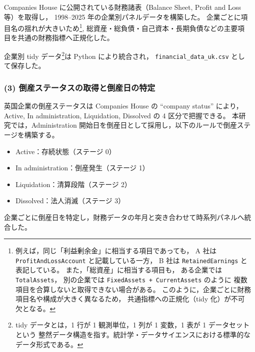 Companies House に公開されている財務諸表（Balance Sheet, Profit and Loss 等）を取得し，
1998--2025 年の企業別パネルデータを構築した。
企業ごとに項目名の揺れが大きいため\footnote{
例えば，同じ「利益剰余金」に相当する項目であっても，
A 社は \texttt{ProfitAndLossAccount} と記載している一方，
B 社は \texttt{RetainedEarnings} と表記している。
また，「総資産」に相当する項目も，
ある企業では \texttt{TotalAssets}，
別の企業では \texttt{FixedAssets + CurrentAssets} のように
複数項目を合算しないと取得できない場合がある。
このように，企業ごとに財務項目名や構成が大きく異なるため，
共通指標への正規化（tidy 化）が不可欠となる。},
総資産・総負債・自己資本・長期負債などの主要項目を共通の財務指標へ正規化した。

企業別 tidy データ\footnote{
tidy データとは，1 行が 1 観測単位，1 列が 1 変数，1 表が 1 データセットという
整然データ構造を指す。統計学・データサイエンスにおける標準的なデータ形式である。
}は Python により統合され，
\texttt{financial\_data\_uk.csv} として保存した。


\subsubsection{(3) 倒産ステータスの取得と倒産日の特定}

英国企業の倒産ステータスは Companies House の ``company status'' により，
Active, In administration, Liquidation, Dissolved の 4 区分で把握できる。
本研究では，Administration 開始日を倒産日として採用し，以下のルールで倒産ステージを構築する。

\begin{itemize}
    \item Active：存続状態（ステージ 0）
    \item In administration：倒産発生（ステージ 1）
    \item Liquidation：清算段階（ステージ 2）
    \item Dissolved：法人消滅（ステージ 3）
\end{itemize}

企業ごとに倒産日を特定し，財務データの年月と突き合わせて時系列パネルへ統合した。


